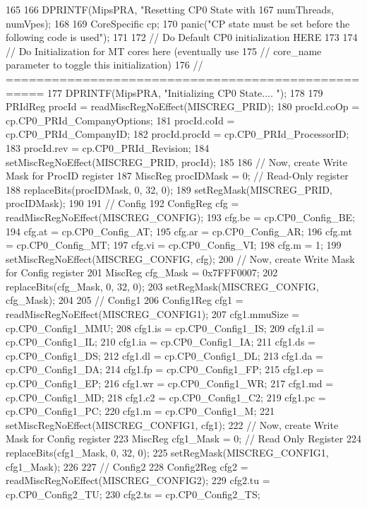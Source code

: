 \begin{DoxyCode}
165 {
166     DPRINTF(MipsPRA, "Resetting CP0 State with %
167             numThreads, numVpes);
168 
169     CoreSpecific cp;
170     panic("CP state must be set before the following code is used");
171 
172     // Do Default CP0 initialization HERE
173 
174     // Do Initialization for MT cores here (eventually use
175     // core_name parameter to toggle this initialization)
176     // ===================================================
177     DPRINTF(MipsPRA, "Initializing CP0 State.... ");
178 
179     PRIdReg procId = readMiscRegNoEffect(MISCREG_PRID);
180     procId.coOp = cp.CP0_PRId_CompanyOptions;
181     procId.coId = cp.CP0_PRId_CompanyID;
182     procId.procId = cp.CP0_PRId_ProcessorID;
183     procId.rev = cp.CP0_PRId_Revision;
184     setMiscRegNoEffect(MISCREG_PRID, procId);
185 
186     // Now, create Write Mask for ProcID register
187     MiscReg procIDMask = 0; // Read-Only register
188     replaceBits(procIDMask, 0, 32, 0);
189     setRegMask(MISCREG_PRID, procIDMask);
190 
191     // Config
192     ConfigReg cfg = readMiscRegNoEffect(MISCREG_CONFIG);
193     cfg.be = cp.CP0_Config_BE;
194     cfg.at = cp.CP0_Config_AT;
195     cfg.ar = cp.CP0_Config_AR;
196     cfg.mt = cp.CP0_Config_MT;
197     cfg.vi = cp.CP0_Config_VI;
198     cfg.m = 1;
199     setMiscRegNoEffect(MISCREG_CONFIG, cfg);
200     // Now, create Write Mask for Config register
201     MiscReg cfg_Mask = 0x7FFF0007;
202     replaceBits(cfg_Mask, 0, 32, 0);
203     setRegMask(MISCREG_CONFIG, cfg_Mask);
204 
205     // Config1
206     Config1Reg cfg1 = readMiscRegNoEffect(MISCREG_CONFIG1);
207     cfg1.mmuSize = cp.CP0_Config1_MMU;
208     cfg1.is = cp.CP0_Config1_IS;
209     cfg1.il = cp.CP0_Config1_IL;
210     cfg1.ia = cp.CP0_Config1_IA;
211     cfg1.ds = cp.CP0_Config1_DS;
212     cfg1.dl = cp.CP0_Config1_DL;
213     cfg1.da = cp.CP0_Config1_DA;
214     cfg1.fp = cp.CP0_Config1_FP;
215     cfg1.ep = cp.CP0_Config1_EP;
216     cfg1.wr = cp.CP0_Config1_WR;
217     cfg1.md = cp.CP0_Config1_MD;
218     cfg1.c2 = cp.CP0_Config1_C2;
219     cfg1.pc = cp.CP0_Config1_PC;
220     cfg1.m = cp.CP0_Config1_M;
221     setMiscRegNoEffect(MISCREG_CONFIG1, cfg1);
222     // Now, create Write Mask for Config register
223     MiscReg cfg1_Mask = 0; // Read Only Register
224     replaceBits(cfg1_Mask, 0, 32, 0);
225     setRegMask(MISCREG_CONFIG1, cfg1_Mask);
226 
227     // Config2
228     Config2Reg cfg2 = readMiscRegNoEffect(MISCREG_CONFIG2);
229     cfg2.tu = cp.CP0_Config2_TU;
230     cfg2.ts = cp.CP0_Config2_TS;
}
\end{DoxyCode}

